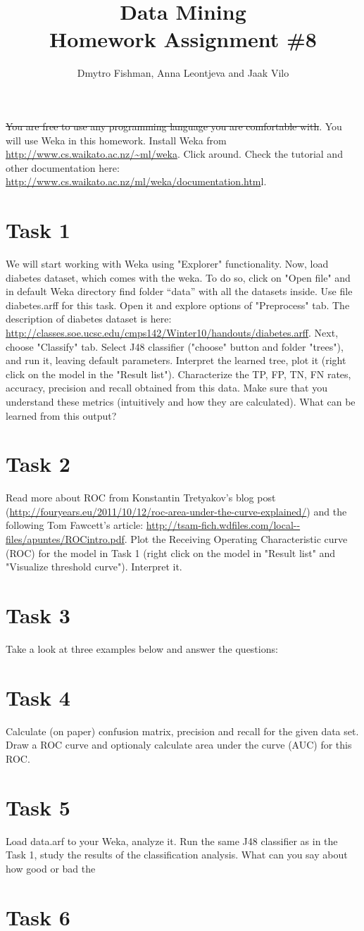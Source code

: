 \documentclass{article}
\title{Data Mining\\Homework Assignment \#8} %
\author{Dmytro Fishman, Anna Leontjeva and Jaak Vilo} %
\begin{document}
\maketitle %

\st{You are free to use any programming language you are comfortable with}. You will use Weka in this homework. Install Weka from \url{http://www.cs.waikato.ac.nz/~ml/weka}. Click around. Check the tutorial and other documentation here: \url{http://www.cs.waikato.ac.nz/ml/weka/documentation.htm}l.

\section*{Task 1}
We will start working with Weka using "Explorer" functionality. Now, load diabetes dataset, which comes with the weka. To do so, click on "Open file" and in default Weka directory find folder ``data'' with all the datasets inside. Use file diabetes.arff for this task. Open it and explore options of "Preprocess" tab. The description of diabetes dataset is here: \url{http://classes.soe.ucsc.edu/cmps142/Winter10/handouts/diabetes.arff}. 
Next, choose "Classify" tab. Select J48 classifier ("choose" button and folder "trees"), and run it, leaving default parameters. Interpret the learned tree, plot it (right click on the model in the "Result list"). Characterize the TP, FP, TN, FN rates, accuracy, precision and recall obtained from this data. Make sure that you understand these metrics (intuitively and how they are calculated). What can be learned from this output?

\section*{Task 2}
Read more about ROC from Konstantin Tretyakov's blog post (\url{http://fouryears.eu/2011/10/12/roc-area-under-the-curve-explained/}) and the following Tom Fawcett's article: \url{http://tsam-fich.wdfiles.com/local--files/apuntes/ROCintro.pdf}. Plot the Receiving Operating Characteristic curve (ROC) for the model in Task 1 (right click on the model in "Result list" and "Visualize threshold curve"). Interpret it. 

\section*{Task 3}
Take a look at three examples below and answer the questions:

\section*{Task 4}
Calculate (on paper) confusion matrix, precision and recall for the given data set. Draw a ROC curve and optionaly calculate area under the curve (AUC) for this ROC.

\section*{Task 5}
Load data.arf to your Weka, analyze it. Run the same J48 classifier as in the Task 1, study the results of the classification analysis. What can you say about how good or bad the   

\section*{Task 6}
\end{document}
